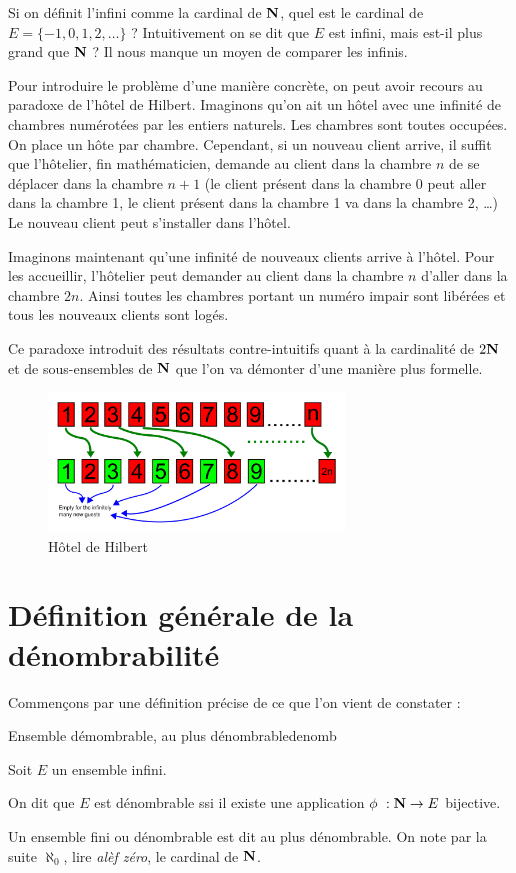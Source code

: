 \documentclass[a4paper,french,final]{memoir}
\begin{document}
Si on définit l'infini comme la cardinal de $\mathbf{N}$, quel est le cardinal de $E= \{-1, 0, 1, 2, \dots\}$ ? Intuitivement on se dit que $E$ est infini, mais est-il plus grand que $\mathbf{N}$ ? Il nous manque un moyen de comparer les infinis.

Pour introduire le problème d'une manière concrète, on peut avoir recours au paradoxe de l'hôtel de Hilbert. Imaginons qu'on ait un hôtel avec une infinité de chambres numérotées par les entiers naturels. Les chambres sont toutes occupées. On place un hôte par chambre. Cependant, si un nouveau client arrive, il suffit que l'hôtelier, fin mathématicien, demande au client dans la chambre $n$ de se déplacer dans la chambre $n+1$ (le client présent dans la chambre 0 peut aller dans la chambre 1, le client présent dans la chambre 1 va dans la chambre 2, \dots) Le nouveau client peut s'installer dans l'hôtel.

Imaginons maintenant qu'une infinité de nouveaux clients arrive à l'hôtel. Pour les accueillir, l'hôtelier peut demander au client dans la chambre $n$ d'aller dans la chambre $2n$. Ainsi toutes les chambres portant un numéro impair sont libérées et tous les nouveaux clients sont logés.

Ce paradoxe introduit des résultats contre-intuitifs quant à la cardinalité de $2 \mathbf{N}$ et de sous-ensembles de $\mathbf{N}$ que l'on va démonter d'une manière plus formelle.

\begin{figure}[htb]
    \centering
    \includegraphics[width=0.7\textwidth,keepaspectratio]{hotel de hilbert.png}
    \caption{Hôtel de Hilbert}
    \label{fig:hotel_hilbert}
\end{figure}
\clearpage
\section{Définition générale de la dénombrabilité}
Commençons par une définition précise de ce que l'on vient de constater :
\begin{defb}{Ensemble démombrable, au plus dénombrable}{denomb}

	 Soit $E$ un ensemble infini. 
	 
	 On dit que $E$ est dénombrable ssi il existe une application $\phi~: \NN \to E $ bijective. 
	 
	 Un ensemble fini ou dénombrable est dit au plus dénombrable. \newline
	 On note par la suite $\aleph_0$, lire \emph{alèf zéro}\footnotemark, le cardinal de $\mathbf{N}$. 
\end{defb}
\end{document}
